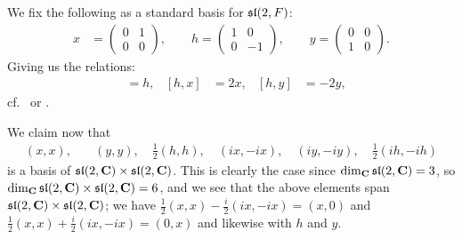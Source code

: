 We fix the following as a standard basis for $\mathfrak{sl}(2,F)$:
\begin{align*}
  x&=
     \begin{pmatrix}
       0 & 1 \\ 0 & 0
     \end{pmatrix}, \qquad h =
                    \begin{pmatrix}
                      1 & 0 \\ 0 & -1
                    \end{pmatrix}, \qquad y =
                                   \begin{pmatrix}
                                     0 & 0 \\ 1 & 0
                                   \end{pmatrix}.
\end{align*}
Giving us the relations:
\begin{align}
  [x,y]&=h, & [h,x]&=2x, & [h,y]&=-2y, \label{eq:sl2rels}
\end{align}
cf.\ \cite[35]{jantzen} or \cite[6]{humphrey}.

We claim now that
\begin{align*}
  (x,x),& \quad (y,y), \quad \tfrac{1}{2}(h,h), \quad (ix,-ix), \quad (iy,-iy), \quad \tfrac{1}{2}(ih,-ih)
\end{align*}
is a basis of $\mathfrak{sl}(2,\mathbf{C})\times \mathfrak{sl}(2,\mathbf{C})$. This is clearly the case since $\dim_{\mathbf{C}} \mathfrak{sl}(2,\mathbf{C}) = 3$, so $\dim_{\mathbf{C}} \mathfrak{sl}(2,\mathbf{C})\times \mathfrak{sl}(2,\mathbf{C}) = 6$, and we see that the above elements span $\mathfrak{sl}(2,\mathbf{C})\times \mathfrak{sl}(2,\mathbf{C})$; we have $\tfrac{1}{2}(x,x)-\tfrac{i}{2}(ix,-ix)=(x,0)$ and $\tfrac{1}{2}(x,x)+\tfrac{i}{2}(ix,-ix)=(0,x)$ and likewise with $h$ and $y$. 

